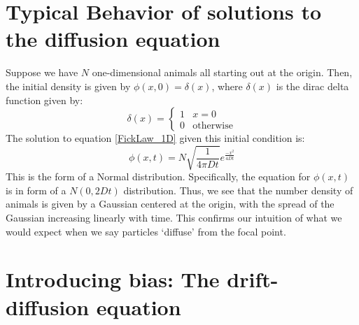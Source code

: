 \section{Typical Behavior of solutions to the diffusion equation}

Suppose we have $N$ one-dimensional animals all starting out at the origin. Then, the initial density is given by $\phi(x,0) = \delta(x)$, where $\delta(x)$ is the dirac delta function given by:
\begin{equation*}
	\delta(x) = 
	\begin{cases}
		1 & x = 0\\
		0 & \textrm{otherwise}
	\end{cases}
\end{equation*}
The solution to equation \eqref{FickLaw_1D} given this initial condition is:
\begin{equation*}
	\phi(x,t) = N\sqrt{\frac{1}{4\pi D t}}e^{\frac{-x^2}{4Dt}}
\end{equation*}
This is the form of a Normal distribution. Specifically, the equation for $\phi(x,t)$ is in form of a $N(0,2Dt)$ distribution. Thus, we see that the number density of animals is given by a Gaussian centered at the origin, with the spread of the Gaussian increasing linearly with time. This confirms our intuition of what we would expect when we say particles `diffuse' from the focal point.

\section{Introducing bias: The drift-diffusion equation}

